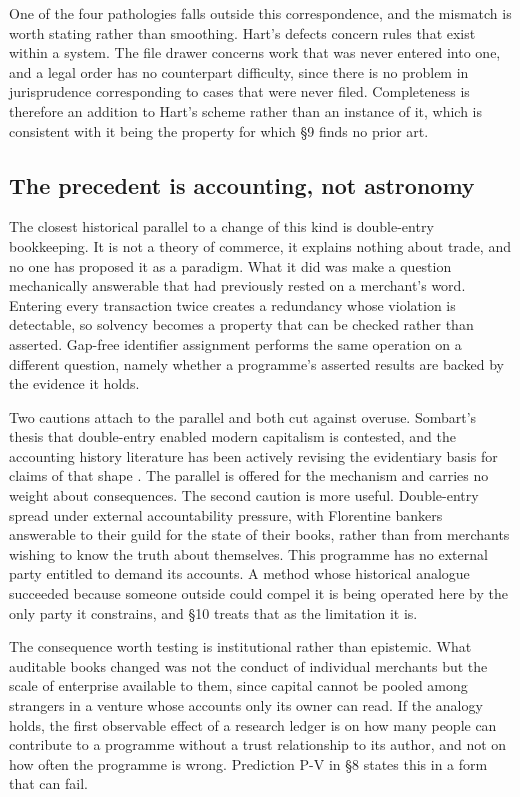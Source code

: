 \documentclass[11pt,letterpaper]{article}
\begin{document}
One of the four pathologies falls outside this correspondence, and the mismatch
is worth stating rather than smoothing. Hart's defects concern rules that exist
within a system. The file drawer concerns work that was never entered into one,
and a legal order has no counterpart difficulty, since there is no problem in
jurisprudence corresponding to cases that were never filed. Completeness is
therefore an addition to Hart's scheme rather than an instance of it, which is
consistent with it being the property for which §9 finds no prior art.

\subsection{The precedent is accounting, not astronomy}

The closest historical parallel to a change of this kind is double-entry
bookkeeping. It is not a theory of commerce, it explains nothing about trade, and
no one has proposed it as a paradigm. What it did was make a question
mechanically answerable that had previously rested on a merchant's word. Entering
every transaction twice creates a redundancy whose violation is detectable, so
solvency becomes a property that can be checked rather than asserted. Gap-free
identifier assignment performs the same operation on a different question, namely
whether a programme's asserted results are backed by the evidence it holds.

Two cautions attach to the parallel and both cut against overuse. Sombart's
thesis that double-entry enabled modern capitalism is contested, and the
accounting history literature has been actively revising the evidentiary basis
for claims of that shape \citep{sangster2025}. The parallel is offered for the
mechanism and carries no weight about consequences. The second caution is more
useful. Double-entry spread under external accountability pressure, with
Florentine bankers answerable to their guild for the state of their books, rather
than from merchants wishing to know the truth about themselves. This programme
has no external party entitled to demand its accounts. A method whose historical
analogue succeeded because someone outside could compel it is being operated here
by the only party it constrains, and §10 treats that as the limitation it is.

The consequence worth testing is institutional rather than epistemic. What
auditable books changed was not the conduct of individual merchants but the scale
of enterprise available to them, since capital cannot be pooled among strangers
in a venture whose accounts only its owner can read. If the analogy holds, the
first observable effect of a research ledger is on how many people can contribute
to a programme without a trust relationship to its author, and not on how often
the programme is wrong. Prediction P-V in §8 states this in a form that can fail.
\end{document}
